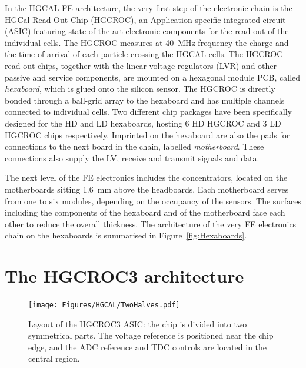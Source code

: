 In the HGCAL FE architecture, the very first step of the electronic chain is the HGCal Read-Out Chip (HGCROC), an Application-specific integrated circuit (ASIC) featuring state-of-the-art electronic components for the read-out of the individual cells. The HGCROC measures at 40~MHz frequency the charge and the time of arrival of each particle crossing the HGCAL cells. 
The HGCROC read-out chips, together with the linear voltage regulators (LVR) and other passive and service components, are mounted on a hexagonal module PCB, called \textit{hexaboard}, which is glued onto the silicon sensor.
The HGCROC is directly bonded through a ball-grid array to the hexaboard and has multiple channels connected to individual cells. 
Two different chip packages have been specifically designed for the HD and LD hexaboards, hosting 6 HD HGCROC and 3 LD HGCROC chips respectively.
Imprinted on the hexaboard are also the pads for connections to the next board in the chain, labelled \textit{motherboard}. These connections also supply the LV, receive and transmit signals and data. 

\bigbreak

The next level of the FE electronics includes the concentrators, located on the motherboards sitting 1.6~mm above the headboards. Each motherboard serves from one to six modules, depending on the occupancy of the sensors. The surfaces including the components of the hexaboard and of the motherboard face each other to reduce the overall thickness. 
The architecture of the very FE electronics chain on the hexaboards is summarised in Figure~\ref{fig:Hexaboards}. 


\section{The HGCROC3 architecture}
\label{sec:The HGCROC3 architecture}

\begin{figure}
    \centering
    \texttt{[image: Figures/HGCAL/TwoHalves.pdf]}
    \caption{Layout of the HGCROC3 ASIC: the chip is divided into two symmetrical parts. The voltage reference is positioned near the chip edge, and the ADC reference and TDC controls are located in the central region.}
    \label{fig:TowHalves}
\end{figure}

